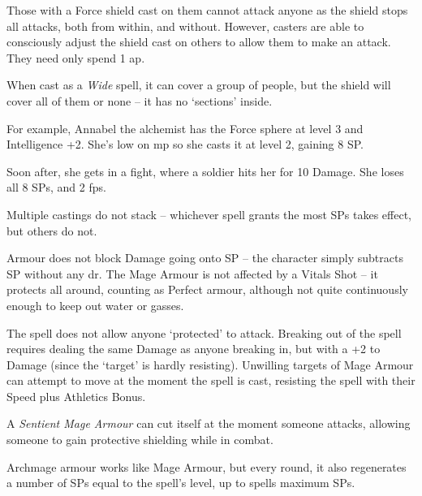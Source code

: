 \begin{multicols}{2}
Those with a Force shield cast on them cannot attack anyone as the shield stops all attacks, both from within, and without.
However, casters are able to consciously adjust the shield cast on others to allow them to make an attack.
They need only spend 1 \gls{ap}.

When cast as a \textit{Wide} spell, it can cover a group of people, but the shield will cover all of them or none -- it has no `sections' inside.

\begin{exampletext}
  For example, Annabel the alchemist has the Force sphere at level 3 and Intelligence +2.
  She's low on \gls{mp} so she casts it at level 2, gaining 8 \gls{SP}.
  
  Soon after, she gets in a fight, where a soldier hits her for 10 Damage.
  She loses all 8 \glspl{SP}, and 2 \glspl{fp}.
\end{exampletext}

Multiple castings do not stack -- whichever spell grants the most \glspl{SP} takes effect, but others do not.

Armour does not block Damage going onto \gls{SP} -- the character simply subtracts \gls{SP} without any \gls{dr}.
The Mage Armour is not affected by a Vitals Shot -- it protects all around, counting as Perfect armour, although not quite continuously enough to keep out water or gasses.

The spell does not allow anyone `protected' to attack.
Breaking out of the spell requires dealing the same Damage as anyone breaking in, but with a +2 to Damage (since the `target' is hardly resisting).
Unwilling targets of Mage Armour can attempt to move at the moment the spell is cast, resisting the spell with their Speed plus Athletics Bonus.

A \textit{Sentient Mage Armour} can cut itself at the moment someone attacks, allowing someone to gain protective shielding while in combat.

\spelllevel


Archmage armour works like Mage Armour, but every round, it also regenerates a number of \glspl{SP} equal to the spell's level, up to spells maximum \glspl{SP}.

\end{multicols}


